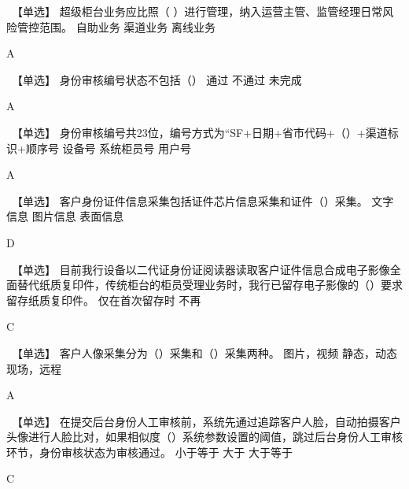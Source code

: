 \documentclass[kindlepaper]{BHCexam4kindle}
\begin{document}
\begin{questions}
\qs　【单选】 超级柜台业务应比照（  ）进行管理，纳入运营主管、监管经理日常风险管控范围。 \xx
{} {  自助业务 } { 渠道业务 } { 离线业务 }
\begin{solution} A \end{solution}
\qs　【单选】 身份审核编号状态不包括（） \xx
{} {  通过 } { 不通过 } { 未完成 }
\begin{solution} A \end{solution}
\qs　【单选】 身份审核编号共23位，编号方式为“SF+日期+省市代码+（）+渠道标识+顺序号 \xx
{} {  设备号 } { 系统柜员号 } { 用户号 }
\begin{solution} A \end{solution}
\qs　【单选】 客户身份证件信息采集包括证件芯片信息采集和证件（）采集。 \xx
{} {  文字信息 } { 图片信息 } { 表面信息 }
\begin{solution} D \end{solution}
\qs　【单选】 目前我行设备以二代证身份证阅读器读取客户证件信息合成电子影像全面替代纸质复印件，传统柜台的柜员受理业务时，我行已留存电子影像的（）要求留存纸质复印件。 \xx
{} {  仅在首次留存时 } { 不再 } {  }
\begin{solution} C \end{solution}
\qs　【单选】 客户人像采集分为（）采集和（）采集两种。 \xx
{} {  图片，视频 } { 静态，动态 } { 现场，远程 }
\begin{solution} A \end{solution}
\qs　【单选】 在提交后台身份人工审核前，系统先通过追踪客户人脸，自动拍摄客户头像进行人脸比对，如果相似度（）系统参数设置的阈值，跳过后台身份人工审核环节，身份审核状态为审核通过。 \xx
{} {  小于等于 } { 大于 } { 大于等于 }
\begin{solution} C \end{solution}

\end{questions}
\end{document}
